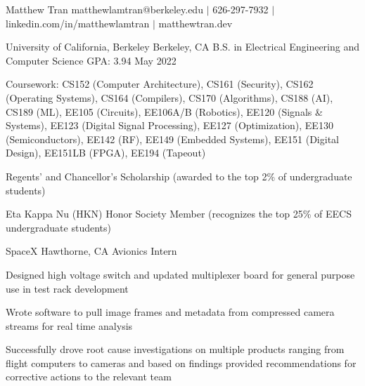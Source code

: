 \documentclass[11pt]{article}
\begin{document}

\namestuff 
{Matthew Tran}
{matthewlamtran@berkeley.edu $|$ 626-297-7932 $|$ linkedin.com/in/matthewlamtran $|$ matthewtran.dev}


\sectiongpa
{University of California, Berkeley} {Berkeley, CA}
{B.S. in Electrical Engineering and Computer Science} {GPA: 3.94} {May 2022}
{\begin{circlist}
	\item Coursework: CS152 (Computer Architecture), CS161 (Security), CS162 (Operating Systems), CS164 (Compilers), CS170 (Algorithms), CS188 (AI), CS189 (ML), EE105 (Circuits), EE106A/B (Robotics), EE120 (Signals \& Systems), EE123 (Digital Signal Processing), EE127 (Optimization), EE130 (Semiconductors), EE142 (RF), EE149 (Embedded Systems), EE151 (Digital Design), EE151LB (FPGA), EE194 (Tapeout)
	\item Regents' and Chancellor's Scholarship (awarded to the top 2\% of undergraduate students)
	\item Eta Kappa Nu (HKN) Honor Society Member (recognizes the top 25\% of EECS undergraduate students)
\end{circlist}}

\rootend


\sectionloc
{SpaceX} {Hawthorne, CA}
{Avionics Intern} {}
{\begin{circlist}
	\item Designed high voltage switch and updated multiplexer board for general purpose use in test rack development
	\item Wrote software to pull image frames and metadata from compressed camera streams for real time analysis
\end{circlist}
\begin{circlist}
	\item Successfully drove root cause investigations on multiple products ranging from flight computers to cameras and based on findings provided recommendations for corrective actions to the relevant team
\end{circlist}}

\rootend

\end{document}
